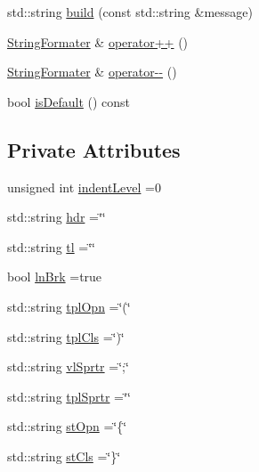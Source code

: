 \begin{DoxyCompactItemize}
\item 
std\+::string \hyperlink{classStringFormater_a1772b0244f215c077dfd34248c9f0428}{build} (const std\+::string \&message)
\item 
\hyperlink{classStringFormater}{String\+Formater} \& \hyperlink{classStringFormater_ab612366361a069eae7a1ebd645b47f62}{operator++} ()
\item 
\hyperlink{classStringFormater}{String\+Formater} \& \hyperlink{classStringFormater_a2d42daa669ee9405b94b35ea121a9f95}{operator-\/-\/} ()
\item 
bool \hyperlink{classStringFormater_ac16a9d38ab08c90faf1f0d3e2c2a648d}{is\+Default} () const
\end{DoxyCompactItemize}
\subsection*{Private Attributes}
\begin{DoxyCompactItemize}
\item 
unsigned int \hyperlink{classStringFormater_a6e7f3ad35026161d483da43928ddba01}{indent\+Level} =0
\item 
std\+::string \hyperlink{classStringFormater_a9b6627c0ee0fb27f698b2deff50a8497}{hdr} =\char`\"{}\char`\"{}
\item 
std\+::string \hyperlink{classStringFormater_a8f78ca87611e1e1e35534100c4aeaccd}{tl} =\char`\"{}\char`\"{}
\item 
bool \hyperlink{classStringFormater_afb5df3fdcd0de7289d2a53c9e62dff7c}{ln\+Brk} =true
\item 
std\+::string \hyperlink{classStringFormater_a021c71f2e67718053bf9dcc3107cb204}{tpl\+Opn} =\char`\"{}(\char`\"{}
\item 
std\+::string \hyperlink{classStringFormater_a334df00dacdd2898052b9b4e70b06e3b}{tpl\+Cls} =\char`\"{})\char`\"{}
\item 
std\+::string \hyperlink{classStringFormater_a6749d9c5fe85817f9232bf7987e2a28e}{vl\+Sprtr} =\char`\"{};\char`\"{}
\item 
std\+::string \hyperlink{classStringFormater_a10b02d7f29048b2e90d7c59a656ed5db}{tpl\+Sprtr} =\char`\"{}\char`\"{}
\item 
std\+::string \hyperlink{classStringFormater_a379be3eaf83aed31e04273af58ac9c06}{st\+Opn} =\char`\"{}\{\char`\"{}
\item 
std\+::string \hyperlink{classStringFormater_a16da4f4ac44449b3da5c2c18bfb08ef1}{st\+Cls} =\char`\"{}\}\char`\"{}
\end{DoxyCompactItemize}


